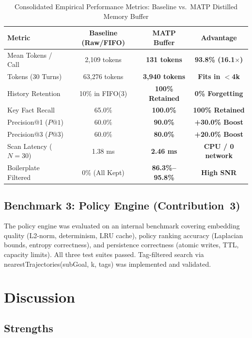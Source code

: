\documentclass[lettersize,journal]{IEEEtran}
\begin{document}
\begin{table}[!t]
\caption{Consolidated Empirical Performance Metrics: Baseline vs.\ MATP Distilled Memory Buffer\label{tab:metrics_summary}}
\centering
{\footnotesize
\begin{tabular}{lccc}
\toprule
\textbf{Metric} & \textbf{Baseline (Raw/FIFO)} & \textbf{MATP Buffer} & \textbf{Advantage} \\
\midrule
Mean Tokens / Call      & 2,109 tokens & \textbf{131 tokens} & \textbf{93.8\% (16.1$\times$)} \\
Tokens (30 Turns)       & 63,276 tokens & \textbf{3,940 tokens} & \textbf{Fits in $<$4k} \\
History Retention       & 10\% in FIFO(3) & \textbf{100\% Retained} & \textbf{0\% Forgetting} \\
Key Fact Recall         & 65.0\% & \textbf{100.0\%} & \textbf{100\% Retained} \\
Precision@1 ($P@1$)     & 60.0\% & \textbf{90.0\%} & \textbf{+30.0\% Boost} \\
Precision@3 ($P@3$)     & 60.0\% & \textbf{80.0\%} & \textbf{+20.0\% Boost} \\
Scan Latency ($N=30$)   & 1.38 ms & \textbf{2.46 ms} & \textbf{CPU / 0 network} \\
Boilerplate Filtered    & 0\% (All Kept) & \textbf{86.3\%--95.8\%} & \textbf{High SNR} \\
\bottomrule
\end{tabular}
}
\end{table}

\subsection{Benchmark 3: Policy Engine (Contribution~3)}

The policy engine was evaluated on an internal benchmark covering embedding quality (L2-norm, determinism, LRU cache), policy ranking accuracy (Laplacian bounds, entropy correctness), and persistence correctness (atomic writes, TTL, capacity limits). All three test suites passed. Tag-filtered search via nearestTrajectories(subGoal, k, tags) was implemented and validated.

\section{Discussion}

\subsection{Strengths}
\end{document}
